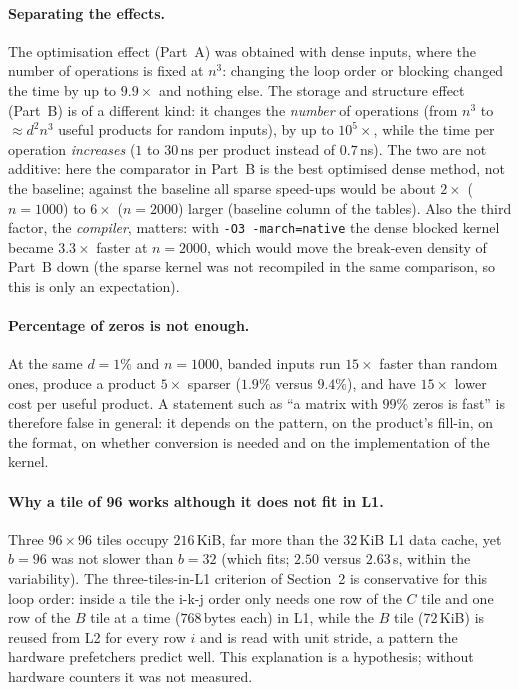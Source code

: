 \paragraph{Separating the effects.} The optimisation effect (Part~A) was obtained with dense inputs, where the number of operations is fixed at $n^3$: changing the loop order or blocking changed the time by up to $9.9\times$ and nothing else. The storage and structure effect (Part~B) is of a different kind: it changes the \emph{number} of operations (from $n^3$ to $\approx d^2n^3$ useful products for random inputs),
by up to $10^5\times$, while the time per operation \emph{increases} ($1$ to $30$\,ns per product instead of $0.7$\,ns). The two are not additive: here the comparator in Part~B is the best optimised dense method, not the baseline; against the baseline all sparse speed-ups would be about $2\times$ ($n=1000$) to $6\times$ ($n=2000$) larger (baseline column of the tables). Also the
third factor, the \emph{compiler}, matters: with \texttt{-O3 -march=native} the dense blocked kernel became $3.3\times$ faster at $n=2000$, which would move the break-even density of Part~B down (the sparse kernel was not recompiled in the same comparison, so this is only an expectation).

\paragraph{Percentage of zeros is not enough.} At the same $d=1\%$ and $n=1000$, banded inputs run $15\times$ faster than random ones, produce a product $5\times$ sparser ($1.9\%$ versus $9.4\%$), and have $15\times$ lower cost per useful product. A statement such as ``a matrix with $99\%$ zeros is fast'' is therefore false in general: it depends on the pattern,
on the product's fill-in, on the format, on whether conversion is needed and on the implementation of the kernel.

\paragraph{Why a tile of 96 works although it does not fit in L1.} Three $96\times96$ tiles occupy $216$\,KiB, far more than the $32$\,KiB L1 data cache, yet $b=96$ was not slower than $b=32$ (which fits; $2.50$ versus $2.63$\,s, within the variability). The three-tiles-in-L1 criterion of Section~2 is conservative for this loop order: inside a tile the i-k-j order only needs one row of the $C$ tile and one row of the $B$ tile at a time ($768$\,bytes each) in L1, while the $B$ tile ($72$\,KiB) is reused from L2 for every row $i$ and is read with unit stride, a pattern the hardware prefetchers predict well. This explanation is a hypothesis; without hardware counters it was not measured.


